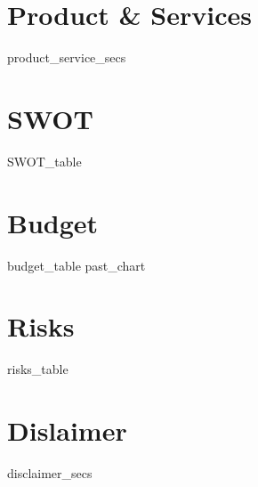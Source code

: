 \documentclass[11pt]{article}
\begin{document}
\newpage{}
\section{Product \& Services}
{{ product_service_secs }}

\newpage{}
\section{SWOT}
{{ SWOT_table }}

\section{Budget}
{{ budget_table }}
{{ past_chart }}

\newpage{}
\section{Risks}
{{ risks_table }}

\newpage{}
\section{Dislaimer}
{{ disclaimer_secs }}
\end{document}
